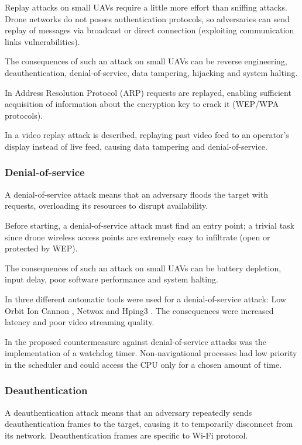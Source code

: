 \documentclass[journal]{IEEEtran}
\begin{document}
Replay attacks on small UAVs require a little more effort than sniffing attacks. Drone networks do not posses authentication protocols, so adversaries can send replay of messages via broadcast or direct connection (exploiting communication links vulnerabilities).

The consequences of such an attack on small UAVs can be reverse engineering, deauthentication, denial-of-service, data tampering, hijacking and system halting.

In \cite{publicsafetynetworksecurity} Address Resolution Protocol (ARP) requests are replayed, enabling sufficient acquisition of information about the encryption key to crack it (WEP/WPA protocols).

In \cite{uavvulnerabilitiesreview} a video replay attack is described, replaying past video feed to an operator's display instead of live feed, causing data tampering and denial-of-service.

\subsubsection{Denial-of-service}
A denial-of-service attack means that an adversary floods the target with requests, overloading its resources to disrupt availability.

Before starting, a denial-of-service attack must find an entry point; a trivial task since drone wireless access points are extremely easy to infiltrate (open or protected by WEP). 

The consequences of such an attack on small UAVs can be battery depletion, input delay, poor software performance and system halting.

In \cite{dosardrone} three different automatic tools were used for a denial-of-service attack: Low Orbit Ion Cannon \cite{loic}, Netwox \cite{netwox} and Hping3 \cite{hping3}. The consequences were increased latency and poor video streaming quality.

In \cite{uavcommonsecurityattacks} the proposed countermeasure against denial-of-service attacks was the implementation of a watchdog timer.  Non-navigational processes had low priority in the scheduler and could access the CPU only for a chosen amount of time.

\subsubsection{Deauthentication}
A deauthentication attack means that an adversary repeatedly sends deauthentication frames to the target, causing it to temporarily disconnect from its network. Deauthentication frames are specific to Wi-Fi protocol.
\end{document}
